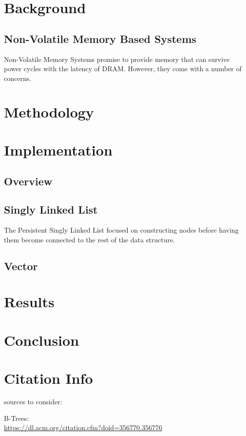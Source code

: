 \documentclass[twocolumn]{article}
\begin{document}
\section{Background}

\subsection{Non-Volatile Memory Based Systems}

Non-Volatile Memory Systems promise to provide memory that can survive power
cycles with the latency of DRAM. 
However, they come with a number of concerns.

\section{Methodology}


\section{Implementation}

\subsection{Overview}

\begin{comment}
We focused on making things persistent (invalid state not possible). We also
used clwb
(\url{https://software.intel.com/sites/landingpage/IntrinsicsGuide/#text=clwb&expand=662}
from intrinsics refernce).

We multiplied results from cachegrind to reflect NVM timings accordingly...

We further used pilot to aid in analysis of the results and structuring the
benchmark.
\end{comment}

\subsection{Singly Linked List}

The Persistent Singly Linked List focused on constructing nodes before having
them become connected to the rest of the data structure.

\subsection{Vector}

\section{Results}

\section{Conclusion}

\section{Citation Info}


sources to consider:

B-Trees:\\
\url{https://dl.acm.org/citation.cfm?doid=356770.356776}
\end{document}
